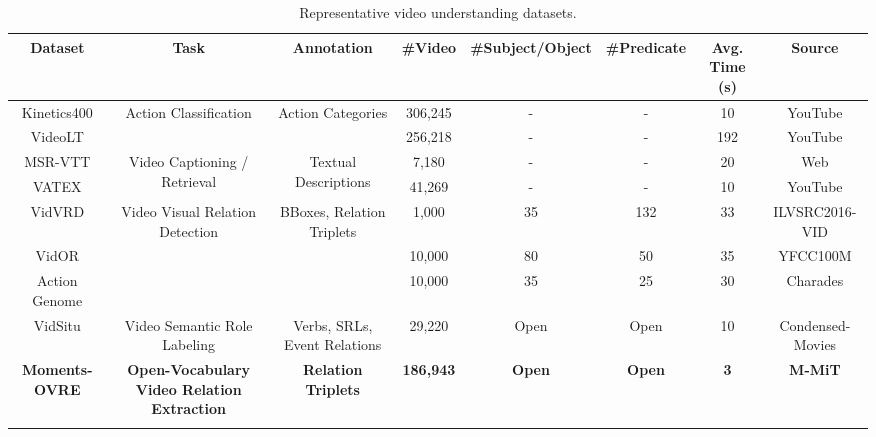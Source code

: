 \documentclass[letterpaper]{article}
\begin{document}
\begin{table}[t]
\centering
\caption{Representative video understanding datasets.}
\begin{adjustbox}{width=\textwidth}
\begin{tabular}{cccccccc}
\toprule
Dataset & Task & Annotation & \#Video & \#Subject/Object & \#Predicate & Avg. Time (s) & Source \\
\midrule
Kinetics400 & \multirow{2}{*}{Action Classification} & \multirow{2}{*}{Action Categories} & 306,245 & - & - & 10 & YouTube\\
VideoLT &  &  & 256,218 & - & - & 192 & YouTube\\
\midrule
MSR-VTT & \multirow{2}{*}{Video Captioning / Retrieval} & \multirow{2}{*}{Textual Descriptions} & 7,180 & - & - & 20 & Web\\
VATEX & & & 41,269 & - & - & 10 & YouTube\\
\midrule
VidVRD & \multirow{3}{*}{Video Visual Relation Detection} & \multirow{3}{*}{BBoxes, Relation Triplets} & 1,000 & 35 & 132 & 33 & ILVSRC2016-VID\\
VidOR & & & 10,000 & 80 & 50 & 35 & YFCC100M\\
Action Genome & & & 10,000 & 35 & 25 & 30 & Charades\\
\midrule
VidSitu & Video Semantic Role Labeling & Verbs, SRLs, Event Relations & 29,220 & Open & Open & 10 & Condensed-Movies\\
\midrule
\textbf{Moments-OVRE} & \textbf{Open-Vocabulary Video Relation Extraction} & \textbf{Relation Triplets} & \textbf{186,943} & \textbf{Open} & \textbf{Open} & \textbf{3} & \textbf{M-MiT}\\

\bottomrule
\\
\end{tabular}
\end{adjustbox}
\label{tab:dataset_comp}
\end{table}
\end{document}
